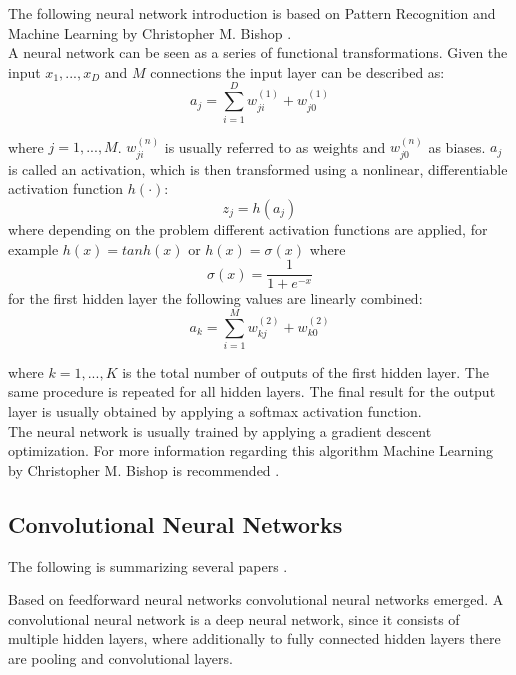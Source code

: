 \documentclass[draft,final,oneside]{vutinfth} %
\begin{document}
The following neural network introduction is based on Pattern Recognition and Machine Learning by Christopher M. Bishop \cite{bishop}. \\ 

A neural network can be seen as a series of functional transformations. Given the input $x_1, ..., x_D$ and $M$ connections the input layer can be described as:
\begin{equation}
a_j = \sum_{i=1}^{D} w_{ji}^{(1)} + w_{j0}^{(1)}
\end{equation}

where $j = 1, ..., M$. $w_{ji}^{(n)}$ is usually referred to as weights and $w_{j0}^{(n)}$ as biases. $a_j$ is called an activation, which is then transformed using a nonlinear, differentiable activation function $h(\cdot)$:
\begin{equation}
z_j = h(a_j)
\end{equation}
where depending on the problem different activation functions are applied, for example $h(x) = tanh(x)$ or $h(x) = \sigma(x)$ where
\begin{equation}
\sigma(x) = \dfrac {1} {1 + e^{-x}}
\end{equation}
for the first hidden layer the following values are linearly combined:
\begin{equation}
a_k = \sum_{i=1}^{M} w_{kj}^{(2)} + w_{k0}^{(2)}
\end{equation}

where $k = 1, ..., K$ is the total number of outputs of the first hidden layer. The same procedure is repeated for all hidden layers. The final result for the output layer is usually obtained by applying a softmax activation function. \\

The neural network is usually trained by applying a gradient descent optimization. For more information regarding this algorithm Machine Learning by Christopher M. Bishop is recommended \cite{bishop}. 

\subsection{Convolutional Neural Networks}
The following is summarizing several papers \cite{dogsvscats}\cite{Druzhkov2016}\cite{cnnnontech}.

Based on feedforward neural networks convolutional neural networks emerged. A convolutional neural network is a deep neural network, since it consists of multiple hidden layers, where additionally to fully connected hidden layers there are pooling and convolutional layers. \\
\end{document}
